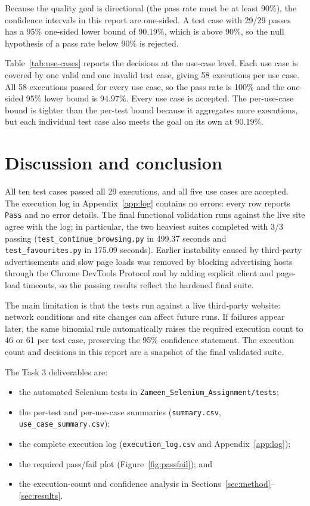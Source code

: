 \documentclass[11pt,a4paper]{article}
\begin{document}
Because the quality goal is directional (the pass rate must be at least
90\%), the confidence intervals in this report are one-sided. A test case
with 29/29 passes has a 95\% one-sided lower bound of 90.19\%, which is above
90\%, so the null hypothesis of a pass rate below 90\% is rejected.

Table~\ref{tab:use-cases} reports the decisions at the use-case level. Each
use case is covered by one valid and one invalid test case, giving 58
executions per use case. All 58 executions passed for every use case, so
the pass rate is 100\% and the one-sided 95\% lower bound is 94.97\%. Every
use case is accepted. The per-use-case bound is tighter than the per-test
bound because it aggregates more executions, but each individual test case
also meets the goal on its own at 90.19\%.



\section{Discussion and conclusion}

All ten test cases passed all 29 executions, and all five use cases are
accepted. The execution log in Appendix~\ref{app:log} contains no errors:
every row reports \texttt{Pass} and no error details. The final
functional validation runs against the live site agree with the log; in
particular, the two heaviest suites completed with 3/3 passing
(\texttt{test\_continue\_browsing.py} in 499.37 seconds and
\texttt{test\_favourites.py} in 175.09 seconds). Earlier instability caused
by third-party advertisements and slow page loads was removed by blocking
advertising hosts through the Chrome DevTools Protocol and by adding
explicit client and page-load timeouts, so the passing results reflect the
hardened final suite.

The main limitation is that the tests run against a live third-party
website: network conditions and site changes can affect future runs. If
failures appear later, the same binomial rule automatically raises the
required execution count to 46 or 61 per test case, preserving the 95\%
confidence statement. The execution count and decisions in this report are
a snapshot of the final validated suite.

The Task 3 deliverables are:
\begin{itemize}[leftmargin=1.5em]
  \item the automated Selenium tests in \texttt{Zameen\_Selenium\_Assignment/tests};
  \item the per-test and per-use-case summaries
        (\texttt{summary.csv}, \texttt{use\_case\_summary.csv});
  \item the complete execution log (\texttt{execution\_log.csv} and
        Appendix~\ref{app:log});
  \item the required pass/fail plot (Figure~\ref{fig:passfail}); and
  \item the execution-count and confidence analysis in
        Sections~\ref{sec:method}--\ref{sec:results}.
\end{itemize}
\end{document}
